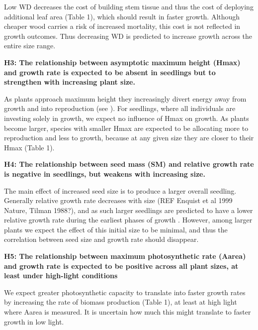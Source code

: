 \documentclass[a4paper]{article}\usepackage[]{graphicx}\usepackage[]{color}
\begin{document}
Low WD decreases the cost of building stem tissue and thus the cost of deploying additional leaf area (Table 1), which should result in faster growth. Although cheaper wood carries a risk of increased mortality, this cost is not reflected in growth outcomes. Thus decreasing WD is predicted to increase growth across the entire size range. 

\textbf{H3: The relationship between asymptotic maximum height (Hmax) and growth rate is expected to be absent in seedlings but to strengthen with increasing plant size.}

As plants approach maximum height they increasingly divert energy away from growth and into reproduction (see \citealt{Thomas:1996do, Falster:2011ii, Wenk:2014jz}). For seedlings, where all individuals are investing solely in growth, we expect no influence of Hmax on growth. As plants become larger, species with smaller Hmax are expected to be allocating more to reproduction and less to growth, because at any given size they are closer to their Hmax (Table 1). 

\textbf{H4: The relationship between seed mass (SM) and relative growth rate is negative in seedlings, but weakens with increasing size.}

The main effect of increased seed size is to produce a larger overall seedling. Generally relative growth rate decreases with size (REF Enquist et al 1999 Nature, Tilman 1988?), and as such larger seedlings are predicted to have a lower relative growth rate during the earliest phases of growth \citet{Turnbull:2012ew}. However, among larger plants we expect the effect of this initial size to be minimal, and thus the correlation between seed size and growth rate should disappear.

\textbf{H5: The relationship between maximum photosynthetic rate (Aarea) and growth rate is expected to be positive across all plant sizes, at least under high-light conditions}

We expect greater photosynthetic capacity to translate into faster growth rates by increasing the rate of biomass production (Table 1), at least at high light where Aarea is measured. It is uncertain how much this might translate to faster growth in low light.
\end{document}
